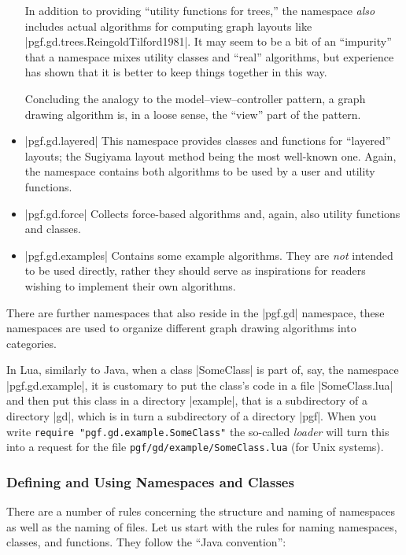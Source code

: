 \begin{itemize}
  In addition to providing ``utility functions for trees,'' the
  namespace \emph{also} includes actual algorithms for computing graph
  layouts like |pgf.gd.trees.ReingoldTilford1981|. It may seem to be a
  bit of an ``impurity'' that a namespace mixes utility classes and
  ``real'' algorithms, but experience has shown that it is better to
  keep things together in this way.

  Concluding the analogy to the model--view--controller pattern, a
  graph drawing algorithm is, in a loose sense, the ``view'' part of
  the pattern.
\item |pgf.gd.layered| This namespace provides classes and functions
  for ``layered'' layouts; the Sugiyama layout method being the most
  well-known one. Again, the namespace contains both algorithms to be
  used by a user and utility functions.
\item |pgf.gd.force| Collects force-based algorithms and, again, also
  utility functions and classes.
\item |pgf.gd.examples| Contains some example algorithms. They are
  \emph{not} intended to be used directly, rather they should serve as
  inspirations for readers wishing to implement their own algorithms.
\end{itemize}

There are further namespaces that also reside in the |pgf.gd|
namespace, these namespaces are used to organize different graph
drawing algorithms into categories.

In Lua, similarly to Java, when a class |SomeClass| is part of, say,
the namespace |pgf.gd.example|, it is customary to put the class's
code in a file |SomeClass.lua| and then put this class in a directory
|example|, that is a subdirectory of a directory |gd|, which is in
turn a subdirectory of a directory |pgf|. When you write
\texttt{require "pgf.gd.example.SomeClass"} the so-called
\emph{loader} will turn this into a request for the file
\texttt{pgf/gd/example/SomeClass.lua} (for Unix systems).



\subsubsection{Defining and Using Namespaces and Classes}

There are a number of rules concerning the structure and naming of
namespaces as well as the naming of files. Let us start with the
rules for naming namespaces, classes, and functions. They follow the
``Java convention'':

